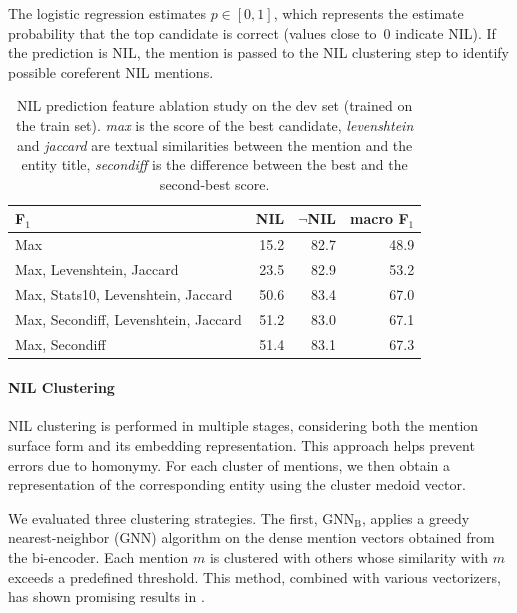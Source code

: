 The logistic regression estimates $p \in [0,1]$, which represents the estimate probability that the top candidate is correct (values close to~0 indicate NIL). If the prediction is NIL, the mention is passed to the NIL clustering step to identify possible coreferent NIL mentions.



\begin{table}
    \centering
\begin{tabular}{lrrr}
\toprule
F$_1$ &  NIL &  $\neg$NIL &  macro F$_1$  \\

\midrule
Max                               &  15.2 &  82.7 &          48.9 \\
Max, Levenshtein, Jaccard           &  23.5 &  82.9 &          53.2 \\
Max, Stats10, Levenshtein, Jaccard   &  50.6 &  83.4 &          67.0 \\
Max, Secondiff, Levenshtein, Jaccard &  51.2 &  83.0 &          67.1 \\
Max, Secondiff                     &  51.4 &  83.1 &          67.3 \\
\bottomrule
\end{tabular}
    \caption{NIL prediction feature ablation study on the dev set (trained on the train set). \textit{max} is the score of the best candidate, \textit{levenshtein} and \textit{jaccard} are textual similarities between the mention and the entity title, \textit{secondiff} is the difference between the best and the second-best score.}
    \label{tab:feature_ablation_study}
\end{table}

\paragraph{NIL Clustering} NIL clustering is performed in multiple stages, considering both the mention surface form and its embedding representation. This approach helps prevent errors due to homonymy. For each cluster of mentions, we then obtain a representation of the corresponding entity using the cluster medoid vector.

We evaluated three clustering strategies. The first, \textit{$\text{GNN}_\text{B}$}, applies a greedy nearest-neighbor (GNN) algorithm on the dense mention vectors obtained from the bi-encoder. Each mention $m$ is clustered with others whose similarity with $m$ exceeds a predefined threshold. This method, combined with various vectorizers, has shown promising results in \textcite{streaming_crossdoc_coreference}.

